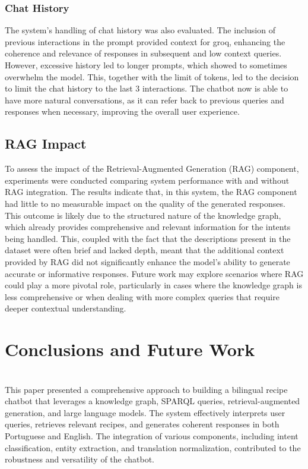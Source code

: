 \documentclass{article}
\begin{document}
\subsubsection{Chat History}
\noindent
The system's handling of chat history was also evaluated. The inclusion of previous interactions in the prompt provided context for groq, enhancing the coherence and relevance of responses in subsequent and low context queries. However, excessive history led to longer prompts, which showed to sometimes overwhelm the model. This, together with the limit of tokens, led to the decision to limit the chat history to the last 3 interactions.
The chatbot now is able to have more natural conversations, as it can refer back to previous queries and responses when necessary, improving the overall user experience.

\subsection{RAG Impact}

\noindent
To assess the impact of the Retrieval-Augmented Generation (RAG) component, experiments were conducted comparing system performance with and without RAG integration. The results indicate that, in this system, the RAG component had little to no measurable impact on the quality of the generated responses. This outcome is likely due to the structured nature of the knowledge graph, which already provides comprehensive and relevant information for the intents being handled. This, coupled with the fact that the descriptions present in the dataset were often brief and lacked depth, meant that the additional context provided by RAG did not significantly enhance the model's ability to generate accurate or informative responses. Future work may explore scenarios where RAG could play a more pivotal role, particularly in cases where the knowledge graph is less comprehensive or when dealing with more complex queries that require deeper contextual understanding.

\section{Conclusions and Future Work}
 
\noindent
\\
This paper presented a comprehensive approach to building a bilingual recipe chatbot that leverages a knowledge graph, SPARQL queries, retrieval-augmented generation, and large language models. The system effectively interprets user queries, retrieves relevant recipes, and generates coherent responses in both Portuguese and English. The integration of various components, including intent classification, entity extraction, and translation normalization, contributed to the robustness and versatility of the chatbot.
\end{document}
